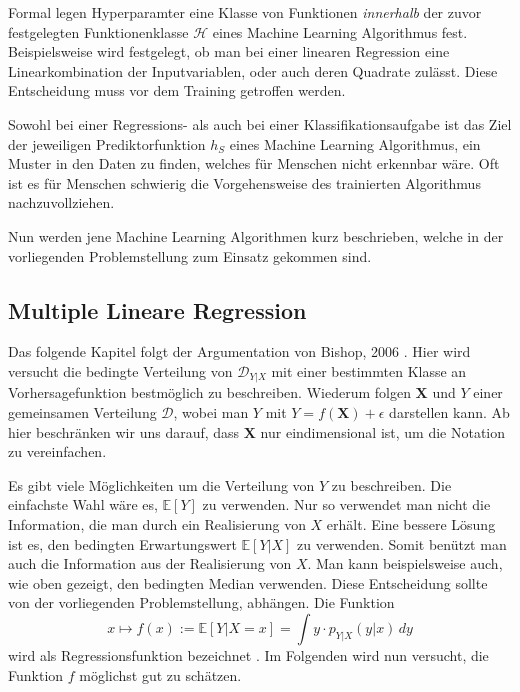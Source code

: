 Formal legen Hyperparamter eine Klasse von Funktionen \textit{innerhalb} der zuvor festgelegten Funktionenklasse $\mathcal{H}$ eines Machine
Learning Algorithmus fest. Beispielsweise wird festgelegt, ob man bei einer linearen Regression eine Linearkombination der Inputvariablen, oder auch deren Quadrate
zul\"asst. Diese Entscheidung muss vor dem Training getroffen werden.


Sowohl bei einer Regressions- als auch bei einer Klassifikationsaufgabe ist das Ziel der jeweiligen Prediktorfunktion $h_S$ eines Machine Learning Algorithmus,
ein Muster in den Daten zu finden, welches f\"ur Menschen nicht erkennbar w\"are. Oft ist es f\"ur Menschen schwierig die Vorgehensweise des trainierten Algorithmus
nachzuvollziehen.

Nun werden jene Machine Learning Algorithmen kurz beschrieben, welche in der vorliegenden Problemstellung zum Einsatz gekommen sind.





























\subsection{Multiple Lineare Regression}

Das folgende Kapitel folgt der Argumentation von Bishop, 2006 \cite[Kapitel 3.1]{bishop}. Hier wird versucht die bedingte Verteilung von $\mathcal{D}_{Y|X}$ mit einer bestimmten Klasse an Vorhersagefunktion bestm\"oglich zu beschreiben.
Wiederum folgen $\mathbf{X}$ und $Y$ einer gemeinsamen Verteilung $\mathcal{D}$, wobei man $Y$ mit $Y = f(\mathbf{X}) + \epsilon$ darstellen kann.
Ab hier beschränken wir uns darauf, dass $\mathbf{X}$ nur eindimensional ist, um die Notation zu vereinfachen.

Es gibt viele M\"oglichkeiten um die Verteilung von $Y$ zu beschreiben. Die einfachste Wahl w\"are es, $\mathbb{E}[Y]$ zu verwenden. Nur so verwendet man nicht die
Information, die man durch ein Realisierung von $X$ erh\"alt. Eine bessere L\"osung ist es, den bedingten Erwartungswert $\mathbb{E}[Y|X]$ zu verwenden. Somit ben\"utzt man auch die Information aus der
Realisierung von $X$. Man kann beispielsweise auch, wie oben gezeigt, den bedingten Median verwenden. Diese Entscheidung sollte von der vorliegenden Problemstellung,
abh\"angen. Die Funktion
$$ x \mapsto f(x) := \mathbb{E}[Y|X = x] = \int y \cdot p_{Y|X}(y|x) \,dy $$
wird als Regressionsfunktion bezeichnet \cite[Seite 209]{wasserman}. Im Folgenden wird nun versucht, die Funktion $f$ m\"oglichst gut zu sch\"atzen.

